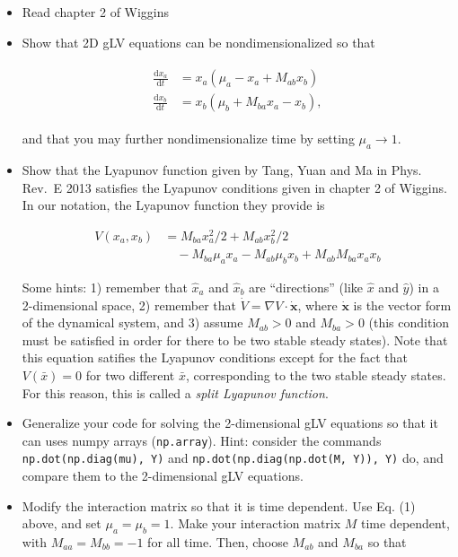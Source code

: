 \documentclass[]{article}
\def\tightlist{}
\begin{document}
\begin{itemize}
\tightlist
\item
  Read chapter 2 of Wiggins
\item
  Show that 2D gLV equations can be nondimensionalized so that

  \begin{align} \begin{split}
      \frac{\text{d}x_a}{\text{d}t} &= x_a (\mu_a - x_a + M_{ab} x_b) \\
      \frac{\text{d}x_b}{\text{d}t} &= x_b (\mu_b + M_{ba}x_a - x_b),
      \label{eq1}
  \end{split} 
  \end{align}

  and that you may further nondimensionalize time by setting
  \(\mu_a \to 1\).
\item
  Show that the Lyapunov function given by Tang, Yuan and Ma in Phys.
  Rev.~E 2013 satisfies the Lyapunov conditions given in chapter 2 of
  Wiggins. In our notation, the Lyapunov function they provide is

  \begin{equation}
  \begin{split}
    V(x_a, x_b) &= M_{ba} x_a^2/2 + M_{ab} x_b^2/2 \\ 
    &\quad - M_{ba} \mu_a x_a - M_{ab} \mu_b x_b + M_{ab} M_{ba} x_a x_b
  \end{split}
  \end{equation}

  Some hints: 1) remember that \(\hat{x}_a\) and \(\hat{x}_b\) are
  ``directions'' (like \(\hat{x}\) and \(\hat{y}\)) in a 2-dimensional
  space, 2) remember that \(\dot{V} = \nabla V \cdot \dot{\textbf{x}}\),
  where \(\dot{\textbf{x}}\) is the vector form of the dynamical system,
  and 3) assume \(M_{ab} > 0\) and \(M_{ba} >  0\) (this condition must
  be satisfied in order for there to be two stable steady states). Note
  that this equation satifies the Lyapunov conditions except for the
  fact that \(V(\bar{x}) = 0\) for two different \(\bar{x}\),
  corresponding to the two stable steady states. For this reason, this
  is called a \textit{split Lyapunov function}.
\item
  Generalize your code for solving the 2-dimensional gLV equations so
  that it can uses numpy arrays (\texttt{np.array}). Hint: consider the
  commands \texttt{np.dot(np.diag(mu), Y)} and
  \texttt{np.dot(np.diag(np.dot(M, Y)), Y)} do, and compare them to the
  2-dimensional gLV equations.
\item
  Modify the interaction matrix so that it is time dependent. Use Eq.
  (1) above, and set \(\mu_a = \mu_b = 1\). Make your interaction matrix
  \(M\) time dependent, with \(M_{aa} = M_{bb} = -1\) for all time.
  Then, choose \(M_{ab}\) and \(M_{ba}\) so that


\end{itemize}
\end{document}
